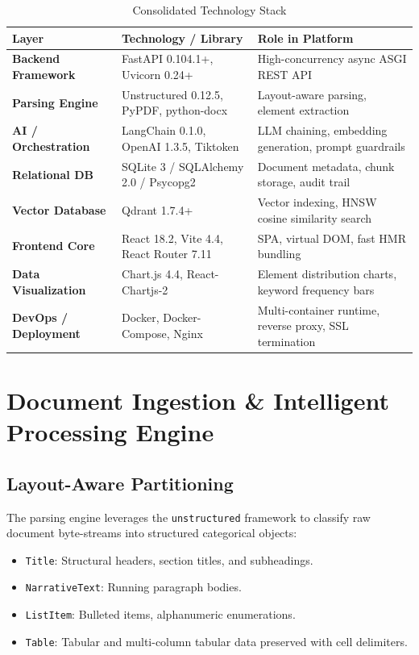 \documentclass[11pt,a4paper]{article}
\begin{document}
\begin{table}[h!]
\centering
\small
\begin{tabularx}{\textwidth}{llX}
\toprule
\textbf{Layer} & \textbf{Technology / Library} & \textbf{Role in Platform} \\
\midrule
\textbf{Backend Framework} & FastAPI 0.104.1+, Uvicorn 0.24+ & High-concurrency async ASGI REST API \\
\textbf{Parsing Engine} & Unstructured 0.12.5, PyPDF, python-docx & Layout-aware parsing, element extraction \\
\textbf{AI / Orchestration} & LangChain 0.1.0, OpenAI 1.3.5, Tiktoken & LLM chaining, embedding generation, prompt guardrails \\
\textbf{Relational DB} & SQLite 3 / SQLAlchemy 2.0 / Psycopg2 & Document metadata, chunk storage, audit trail \\
\textbf{Vector Database} & Qdrant 1.7.4+ & Vector indexing, HNSW cosine similarity search \\
\textbf{Frontend Core} & React 18.2, Vite 4.4, React Router 7.11 & SPA, virtual DOM, fast HMR bundling \\
\textbf{Data Visualization} & Chart.js 4.4, React-Chartjs-2 & Element distribution charts, keyword frequency bars \\
\textbf{DevOps / Deployment} & Docker, Docker-Compose, Nginx & Multi-container runtime, reverse proxy, SSL termination \\
\bottomrule
\end{tabularx}
\caption{Consolidated Technology Stack}
\end{table}

\section{Document Ingestion \& Intelligent Processing Engine}

\subsection{Layout-Aware Partitioning}
The parsing engine leverages the \texttt{unstructured} framework to classify raw document byte-streams into structured categorical objects:
\begin{itemize}
    \item \texttt{Title}: Structural headers, section titles, and subheadings.
    \item \texttt{NarrativeText}: Running paragraph bodies.
    \item \texttt{ListItem}: Bulleted items, alphanumeric enumerations.
    \item \texttt{Table}: Tabular and multi-column tabular data preserved with cell delimiters.
\end{itemize}
\end{document}
